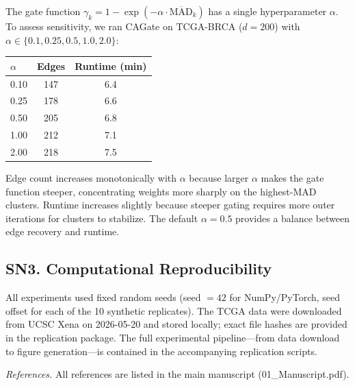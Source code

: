 \documentclass[11pt,a4paper]{article}
\begin{document}
The gate function $\gamma_k = 1 - \exp(-\alpha \cdot \overline{\text{MAD}}_k)$ has a single hyperparameter $\alpha$. To assess sensitivity, we ran CAGate on TCGA-BRCA ($d=200$) with $\alpha \in \{0.1, 0.25, 0.5, 1.0, 2.0\}$:

\begin{center}
\begin{tabular}{lcc}
\toprule
$\alpha$ & Edges & Runtime (min) \\
\midrule
0.10 & 147 & 6.4 \\
0.25 & 178 & 6.6 \\
0.50 & 205 & 6.8 \\
1.00 & 212 & 7.1 \\
2.00 & 218 & 7.5 \\
\bottomrule
\end{tabular}
\end{center}

Edge count increases monotonically with $\alpha$ because larger $\alpha$ makes the gate function steeper, concentrating weights more sharply on the highest-MAD clusters. Runtime increases slightly because steeper gating requires more outer iterations for clusters to stabilize. The default $\alpha = 0.5$ provides a balance between edge recovery and runtime.

\subsection*{SN3. Computational Reproducibility}

All experiments used fixed random seeds (seed $= 42$ for NumPy/PyTorch, seed offset for each of the 10 synthetic replicates). The TCGA data were downloaded from UCSC Xena on 2026-05-20 and stored locally; exact file hashes are provided in the replication package. The full experimental pipeline---from data download to figure generation---is contained in the accompanying replication scripts.

\vspace{12pt}
\noindent\textit{References.} All references are listed in the main manuscript (01\_Manuscript.pdf).
\end{document}
